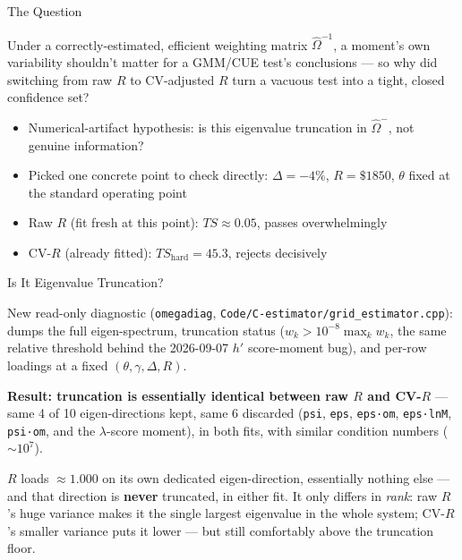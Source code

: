 \documentclass[
  ignorenonframetext,
  aspectratio=169,
]{beamer}
\providecommand{\tightlist}{%
  \setlength{\itemsep}{0pt}\setlength{\parskip}{0pt}}
\begin{document}
\begin{frame}{The Question}
\protect{}\label{the-question}
\footnotesize

Under a correctly-estimated, efficient weighting matrix
\(\hat\Omega^{-1}\), a moment's own variability shouldn't matter for a
GMM/CUE test's conclusions --- so why did switching from raw \(R\) to
CV-adjusted \(R\) turn a vacuous test into a tight, closed confidence
set?

\begin{itemize}
\tightlist
\item
  Numerical-artifact hypothesis: is this eigenvalue truncation in
  \(\hat\Omega^-\), not genuine information?
\item
  Picked one concrete point to check directly: \(\Delta=-4\%\),
  \(R=\$1850\), \(\theta\) fixed at the standard operating point
\item
  Raw \(R\) (fit fresh at this point): \(TS\approx0.05\), passes
  overwhelmingly
\item
  CV-\(R\) (already fitted): \(TS_{\text{hard}}=45.3\), rejects
  decisively
\end{itemize}
\end{frame}

\begin{frame}[fragile]{Is It Eigenvalue Truncation?}
\protect{}\label{is-it-eigenvalue-truncation}
\footnotesize

New read-only diagnostic (\texttt{omegadiag},
\texttt{Code/C-estimator/grid\_estimator.cpp}): dumps the full
eigen-spectrum, truncation status (\(w_k>10^{-8}\max_k w_k\), the same
relative threshold behind the 2026-09-07 \(h'\) score-moment bug), and
per-row loadings at a fixed \((\theta,\gamma,\Delta,R)\).

\textbf{Result: truncation is essentially identical between raw \(R\)
and CV-\(R\)} --- same 4 of 10 eigen-directions kept, same 6 discarded
(\texttt{psi}, \texttt{eps}, \texttt{eps·om}, \texttt{eps·lnM},
\texttt{psi·om}, and the \(\lambda\)-score moment), in both fits, with
similar condition numbers (\(\sim10^7\)).

\(R\) loads \(\approx1.000\) on its own dedicated eigen-direction,
essentially nothing else --- and that direction is \textbf{never}
truncated, in either fit. It only differs in \emph{rank}: raw \(R\)'s
huge variance makes it the single largest eigenvalue in the whole
system; CV-\(R\)'s smaller variance puts it lower --- but still
comfortably above the truncation floor.
\end{frame}
\end{document}
